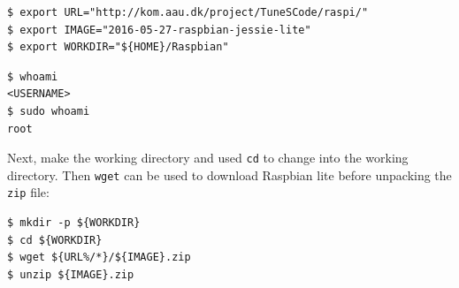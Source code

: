 

\begin{lstlisting}[]
$ export URL="http://kom.aau.dk/project/TuneSCode/raspi/"
$ export IMAGE="2016-05-27-raspbian-jessie-lite"
$ export WORKDIR="${HOME}/Raspbian"
\end{lstlisting}
\FloatBarrier
\vspace{-5mm}


\begin{lstlisting}[]
$ whoami
<USERNAME>
$ sudo whoami
root
\end{lstlisting}
\FloatBarrier
\vspace{-5mm}

Next, make the working directory and used \texttt{cd} to change into the working
directory. Then \texttt{wget} can be used to download Raspbian lite before
unpacking the \texttt{zip} file:

\begin{lstlisting}[]
$ mkdir -p ${WORKDIR}
$ cd ${WORKDIR}
$ wget ${URL%/*}/${IMAGE}.zip
$ unzip ${IMAGE}.zip
\end{lstlisting}
\FloatBarrier
\vspace{-5mm}

